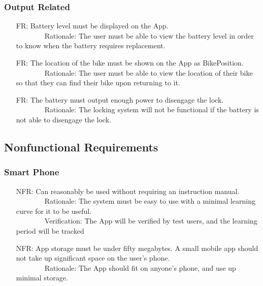 \documentclass[12pt]{article}
\newcounter{reqnum} %
\newcounter{nfrnum} %
\begin{document}
\subsubsection{Output Related}
\begin{itemize}
\setlength{\itemindent}{.5in}
\item[FR\refstepcounter{reqnum}\thereqnum\label{FRBatteryLevelDisplay}:] Battery level must be displayed on the App.
\\ \-\ \-\ \-\ \-\ \-\ \-\ \-\ \-\ Rationale: The user must be able to view the battery level in order to know when the battery requires replacement.
\item[FR\refstepcounter{reqnum}\thereqnum\label{FRLocDisplay}:] The location of the bike must be shown on the App as BikePosition.
\\ \-\ \-\ \-\ \-\ \-\ \-\ \-\ \-\ Rationale: The user must be able to view the location of their bike so that they can find their bike upon returning to it.
\item[FR\refstepcounter{reqnum}\thereqnum\label{FRPower}:] The battery must output enough power to disengage the lock.
\\ \-\ \-\ \-\ \-\ \-\ \-\ \-\ \-\ Rationale: The locking system will not be functional if the battery is not able to disengage the lock.
\end{itemize}

\subsection{Nonfunctional Requirements}

\subsubsection{Smart Phone}
\begin{itemize}
\setlength{\itemindent}{.5in}
\item[NFR\refstepcounter{nfrnum}\thenfrnum\label{NFRInst}:] Can reasonably be used without requiring an instruction manual.
\\ \-\ \-\ \-\ \-\ \-\ \-\ \-\ \-\ Rationale: The system must be easy to use with a minimal learning curve for it to be useful.
\\ \-\ \-\ \-\ \-\ \-\ \-\ \-\ \-\ Verification: The App will be verified by test users, and the learning period will be tracked
\item[NFR\refstepcounter{nfrnum}\thenfrnum\label{NFRStor}:] App storage must be under fifty megabytes. A small mobile app should not take up significant space on the user's phone.
\\ \-\ \-\ \-\ \-\ \-\ \-\ \-\ \-\ Rationale: The App should fit on anyone's phone, and use up minimal storage.
\end{itemize}
\end{document}

